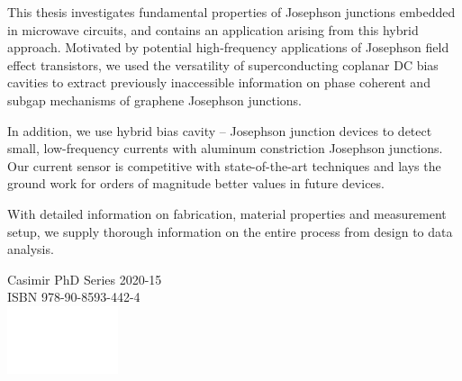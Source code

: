 \documentclass{dissertation-edit}
\begin{document}
\vspace*{1cm}

\Large

\noindent This thesis investigates fundamental properties of Josephson junctions embedded in microwave circuits, and contains an application arising from this hybrid approach.
%
Motivated by potential high-frequency applications of Josephson field effect transistors, we used the versatility of superconducting coplanar DC bias cavities to extract previously inaccessible information on phase coherent and subgap mechanisms of graphene Josephson junctions.

\noindent \newline
In addition, we use hybrid bias cavity -- Josephson junction devices to detect small, low-frequency currents with aluminum constriction Josephson junctions.
%
Our current sensor is competitive with state-of-the-art techniques and lays the ground work for orders of magnitude better values in future devices.

\noindent \newline
With detailed information on fabrication, material properties and measurement setup, we supply thorough information on the entire process from design to data analysis.

\vspace{2.5cm}\noindent\newline\centering
Casimir PhD Series 2020-15\\
ISBN 978-90-8593-442-4\\
\includegraphics[height=2cm]{TU_P5_white}
\end{document}

